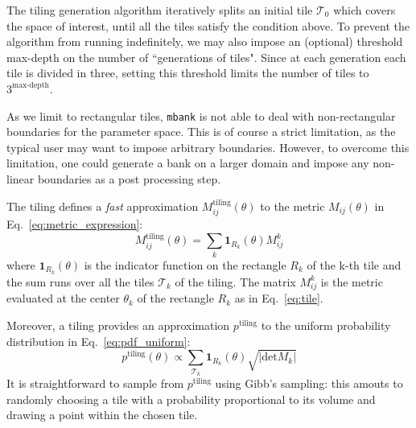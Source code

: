 \documentclass[twocolumn,showpacs,preprintnumbers,nofootinbib,prd,
superscriptaddress,10pt]{revtex4-2}
\begin{document}
The tiling generation algorithm iteratively splits an initial tile $\mathcal{T}_{0}$ which covers the space of interest, until all the tiles satisfy the condition above.
To prevent the algorithm from running indefinitely, we may also impose an (optional) threshold max-depth on the number of ``generations of tiles". Since at each generation each tile is divided in three, setting this threshold limits the number of tiles to $3^{\textrm{max-depth}}$.

As we limit to rectangular tiles, \texttt{mbank} is not able to deal with non-rectangular boundaries for the parameter space. This is of course a strict limitation, as the typical user may want to impose arbitrary boundaries. However, to overcome this limitation, one could generate a bank on a larger domain and impose any non-linear boundaries as a post processing step.

The tiling defines a {\it fast} approximation $M^{\text{tiling}}_{ij}(\theta)$ to the metric $M_{ij}(\theta)$ in Eq.~\eqref{eq:metric_expression}:
\begin{equation}\label{eq:metric_tiling}
	M^\text{tiling}_{ij}(\theta) = \sum_{k} \mathbf{1}_{R_k}(\theta) M^{k}_{ij}
\end{equation}
where $\mathbf{1}_{R_k}(\theta)$ is the indicator function on the rectangle $R_k$ of the k-th tile and the sum runs over all the tiles $\mathcal{T}_k$ of the tiling. The matrix $M^{k}_{ij}$ is the metric evaluated at the center $\theta_k$ of the rectangle $R_k$ as in Eq.~\eqref{eq:tile}.

Moreover, a tiling provides an approximation $p^{\text{tiling}}$ to the uniform probability distribution in Eq.~\eqref{eq:pdf_uniform}:
\begin{equation}\label{eq:tiling_pdf}
	p^{\text{tiling}}(\theta) \propto \sum_{\mathcal{T}_k} \mathbf{1}_{R_k}(\theta) \sqrt{|\text{det} M_k|}
\end{equation}
It is straightforward to sample from $p^{\text{tiling}}$ using Gibb's sampling: this amouts to randomly choosing a tile with a probability proportional to its volume and drawing a point within the chosen tile.

\end{document}
